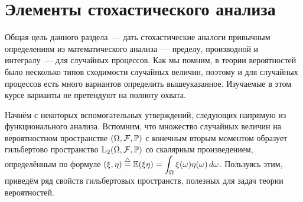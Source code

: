 \section{Элементы стохастического анализа} \label{section:calculus}

Общая цель данного раздела~--- дать стохастические аналоги привычным определениям из математического анализа~---
пределу, производной и интегралу~--- для случайных процессов.
Как мы помним, в теории вероятностей было несколько типов сходимости случайных величин,
поэтому и для случайных процессов есть много вариантов определить вышеуказанное.
Изучаемые в этом курсе варианты не претендуют на полноту охвата.

Начнём с некоторых вспомогательных утверждений, следующих напрямую из функционального анализа.
Вспомним, что множество случайных величин на вероятностном пространстве $ (\Omega, \mathcal{F}, \mathbb{P}) $
с конечным вторым моментом образует гильбертово пространство $ \mathbb{L}_2 (\Omega, \mathcal{F}, \mathbb{P}) $
со скалярным произведением, определённым по формуле $ \displaystyle \left(\xi, \eta\right) \overset{\triangle}{=} \operatorname{\mathbb{E}} (\xi \eta) = \int_\Omega \xi(\omega) \eta(\omega) \, d\omega $.
Пользуясь этим, приведём ряд свойств гильбертовых пространств, полезных для задач теории вероятностей.

